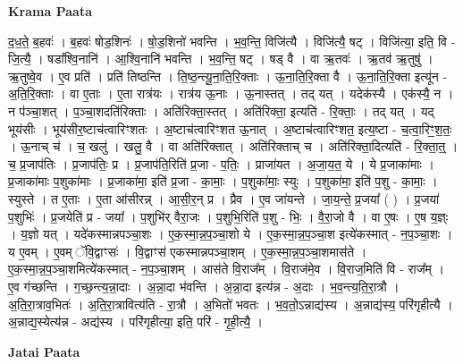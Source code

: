 \documentclass[17pt]{extarticle}
\begin{document}
\textbf{Krama Paata} \newline

द॒ध॒ते॒ ब॒हवः॑ । ब॒हवः॑ षोड॒शिनः॑ । षो॒ड॒शिनो॑ भवन्ति । भ॒व॒न्ति॒ विजि॑त्यै । विजि॑त्यै॒ षट् । विजि॑त्या॒ इति॒ वि - जि॒त्यै॒ । षडा᳚श्वि॒नानि॑ । आ॒श्वि॒नानि॑ भवन्ति । भ॒व॒न्ति॒ षट् । षड् वै । वा ऋ॒तवः॑ । ऋ॒तव॑ ऋ॒तुषु॑ । ऋ॒तुष्वे॒व । ए॒व प्रति॑ । प्रति॑ तिष्ठन्ति । ति॒ष्ठ॒न्त्यू॒ना॒ति॒रि॒क्ताः । ऊ॒ना॒ति॒रि॒क्ता वै । ऊ॒ना॒ति॒रि॒क्ता इत्यू॑न - अ॒ति॒रि॒क्ताः । वा ए॒ताः । ए॒ता रात्र॑यः । रात्र॑य ऊ॒नाः । ऊ॒नास्तत् । तद् यत् । यदेक॑स्यै । एक॑स्यै॒ न । न प॑ञ्चा॒शत् । प॒ञ्चा॒शदति॑रिक्ताः । अति॑रिक्ता॒स्तत् । अति॑रिक्ता॒ इत्यति॑ - रि॒क्ताः॒ । तद् यत् । यद् भूय॑सीः । भूय॑सीर॒ष्टाच॑त्वारिꣳशतः । अ॒ष्टाच॑त्वारिꣳशत ऊ॒नात् । अ॒ष्टाच॑त्वारिꣳशत॒ इत्य॒ष्टा - च॒त्वा॒रिꣳ॒॒श॒तः॒ । ऊ॒नाच् च॑ । च॒ खलु॑ । खलु॒ वै । वा अति॑रिक्तात् । अति॑रिक्ताच् च । अति॑रिक्ता॒दित्यति॑ - रि॒क्ता॒त्॒ । च॒ प्र॒जाप॑तिः । प्र॒जाप॑तिः॒ प्र । प्र॒जाप॑ति॒रिति॑ प्र॒जा - प॒तिः॒ । प्राजा॑यत । अ॒जा॒य॒त॒ ये । ये प्र॒जाका॑माः । प्र॒जाका॑माः प॒शुका॑माः । प्र॒जाका॑मा॒ इति॑ प्र॒जा - का॒माः॒ । प॒शुका॑माः॒ स्युः । प॒शुका॑मा॒ इति॑ प॒शु - का॒माः॒ । स्युस्ते । त ए॒ताः । ए॒ता आ॑सीरन्न् । आ॒सी॒र॒न् प्र । प्रैव । ए॒व जा॑यन्ते । जा॒य॒न्ते॒ प्र॒जया᳚ ( ) । प्र॒जया॑ प॒शुभिः॑ । प्र॒जयेति॑ प्र - जया᳚ । प॒शुभि॑र् वैरा॒जः । प॒शुभि॒रिति॑ प॒शु - भिः॒ । वै॒रा॒जो वै । वा ए॒षः । ए॒ष य॒ज्ञ्ः । य॒ज्ञो यत् । यदे॑कस्मान्नपञ्चा॒शः । ए॒क॒स्मा॒न्न॒प॒ञ्चा॒शो ये । ए॒क॒स्मा॒न्न॒प॒ञ्चा॒श इत्ये॑कस्मात् - न॒प॒ञ्चा॒शः । य ए॒वम् । ए॒वम् ॅवि॒द्वाꣳसः॑ । वि॒द्वाꣳस॑ एकस्मान्नपञ्चा॒शम् । ए॒क॒स्मा॒न्न॒प॒ञ्चा॒शमास॑ते । ए॒क॒स्मा॒न्न॒प॒ञ्चा॒शमित्ये॑कस्मात् - न॒प॒ञ्चा॒शम् । आस॑ते वि॒राज᳚म् । वि॒राज॑मे॒व । वि॒राज॒मिति॑ वि - राज᳚म् । ए॒व ग॑च्छन्ति । ग॒च्छ॒न्त्य॒न्ना॒दाः । अ॒न्ना॒दा भ॑वन्ति । अ॒न्ना॒दा इत्य॑न्न - अ॒दाः । भ॒व॒न्त्य॒ति॒रा॒त्रौ । अ॒ति॒रा॒त्राव॒भितः॑ । अ॒ति॒रा॒त्रावित्य॑ति - रा॒त्रौ । अ॒भितो॑ भवतः । भ॒व॒तो॒ऽन्नाद्य॑स्य । अ॒न्नाद्य॑स्य॒ परि॑गृहीत्यै । अ॒न्नाद्य॒स्येत्य॑न्न - अद्य॑स्य । परि॑गृहीत्या॒ इति॒ परि॑ - गृ॒ही॒त्यै॒ । \newline

\textbf{Jatai Paata} \newline
\end{document}
